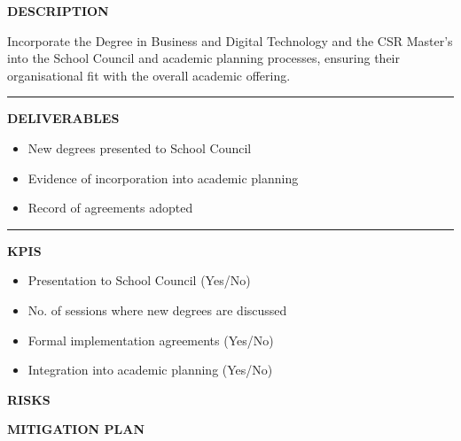 \documentclass[11pt,a4paper]{scrreprt}
\newcommand{\fieldlabel}[1]{%
  {\footnotesize\sffamily\bfseries\color{mutedcolor}\MakeUppercase{#1}}\par\nopagebreak[4]
}
\newcommand{\fieldsep}{\vspace{3pt}\noindent\textcolor{bordercolor}{\rule{\linewidth}{0.4pt}}\vspace{3pt}\par}
\begin{document}
\begin{tcolorbox}[pabox={aacolor}{A.P.2.3 \enspace\textbullet\enspace Integration of New Degrees in Governing Bodies and Academic Planning}]

\fieldlabel{Description}
{\small Incorporate the Degree in Business and Digital Technology and the CSR Master's into the School Council and academic planning processes, ensuring their organisational fit with the overall academic offering.}\par
\fieldsep
\fieldlabel{Deliverables}
{\small \begin{itemize}[noitemsep,topsep=2pt]
\item New degrees presented to School Council
\item Evidence of incorporation into academic planning
\item Record of agreements adopted
\end{itemize}}\par
\fieldsep
\fieldlabel{KPIs}
{\small \begin{itemize}[noitemsep,topsep=2pt]
\item Presentation to School Council (Yes/No)
\item No. of sessions where new degrees are discussed
\item Formal implementation agreements (Yes/No)
\item Integration into academic planning (Yes/No)
\end{itemize}}\par
\end{tcolorbox}
\begin{tcolorbox}[riskbox]
{\footnotesize\sffamily\bfseries\color{red!50!black} RISKS}\par{}
\end{tcolorbox}
\begin{tcolorbox}[mitbox]
{\footnotesize\sffamily\bfseries\color{green!40!black} MITIGATION PLAN}\par{}
\end{tcolorbox}
\vspace{8pt}
\end{document}
